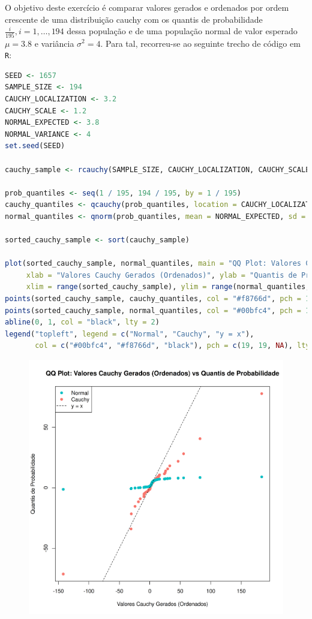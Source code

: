 \documentclass[12pt,a4paper]{article}
\begin{document}
O objetivo deste exercício é comparar valores gerados e ordenados por ordem crescente de uma distribuição cauchy com os
quantis de probabilidade $\frac{i}{195}, i = 1,\ldots,194$ dessa população e de uma população normal de valor esperado
$\mu = 3.8$ e variância $\sigma^{2} = 4$.
Para tal, recorreu-se ao seguinte trecho de código em \texttt{R}:

\quad

\begin{lstlisting}[language=R]
SEED <- 1657
SAMPLE_SIZE <- 194
CAUCHY_LOCALIZATION <- 3.2
CAUCHY_SCALE <- 1.2
NORMAL_EXPECTED <- 3.8
NORMAL_VARIANCE <- 4
set.seed(SEED)

cauchy_sample <- rcauchy(SAMPLE_SIZE, CAUCHY_LOCALIZATION, CAUCHY_SCALE)

prob_quantiles <- seq(1 / 195, 194 / 195, by = 1 / 195)
cauchy_quantiles <- qcauchy(prob_quantiles, location = CAUCHY_LOCALIZATION, scale = CAUCHY_SCALE)
normal_quantiles <- qnorm(prob_quantiles, mean = NORMAL_EXPECTED, sd = sqrt(NORMAL_VARIANCE))

sorted_cauchy_sample <- sort(cauchy_sample)

plot(sorted_cauchy_sample, normal_quantiles, main = "QQ Plot: Valores Cauchy Gerados (Ordenados) vs Quantis de Probabilidade",
     xlab = "Valores Cauchy Gerados (Ordenados)", ylab = "Quantis de Probabilidade",
     xlim = range(sorted_cauchy_sample), ylim = range(normal_quantiles, cauchy_quantiles))
points(sorted_cauchy_sample, cauchy_quantiles, col = "#f8766d", pch = 19)
points(sorted_cauchy_sample, normal_quantiles, col = "#00bfc4", pch = 19)
abline(0, 1, col = "black", lty = 2)
legend("topleft", legend = c("Normal", "Cauchy", "y = x"),
       col = c("#00bfc4", "#f8766d", "black"), pch = c(19, 19, NA), lty = c(NA, NA, 2))
\end{lstlisting}

\begin{figure}[h]
  \centering
  \includegraphics[scale = 0.77]{./ex08.png}
\end{figure}
\end{document}

